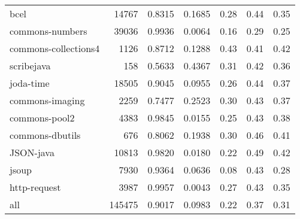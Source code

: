 \begin{table*}
\begin{tabular}{lrrrrrr}
                   bcel &   14767 &          0.8315 &          0.1685 &         0.28 &         0.44 &             0.35 \\
        commons-numbers &   39036 &          0.9936 &          0.0064 &         0.16 &         0.29 &             0.25 \\
   commons-collections4 &    1126 &          0.8712 &          0.1288 &         0.43 &         0.41 &             0.42 \\
             scribejava &     158 &          0.5633 &          0.4367 &         0.31 &         0.42 &             0.36 \\
              joda-time &   18505 &          0.9045 &          0.0955 &         0.26 &         0.44 &             0.37 \\
        commons-imaging &    2259 &          0.7477 &          0.2523 &         0.30 &         0.43 &             0.37 \\
          commons-pool2 &    4383 &          0.9845 &          0.0155 &         0.25 &         0.43 &             0.38 \\
        commons-dbutils &     676 &          0.8062 &          0.1938 &         0.30 &         0.46 &             0.41 \\
              JSON-java &   10813 &          0.9820 &          0.0180 &         0.22 &         0.49 &             0.42 \\
                  jsoup &    7930 &          0.9364 &          0.0636 &         0.08 &         0.43 &             0.28 \\
           http-request &    3987 &          0.9957 &          0.0043 &         0.27 &         0.43 &             0.35 \\
                    all &  145475 &          0.9017 &          0.0983 &         0.22 &         0.37 &             0.31 \\
\bottomrule
\end{tabular}
\end{table*}
